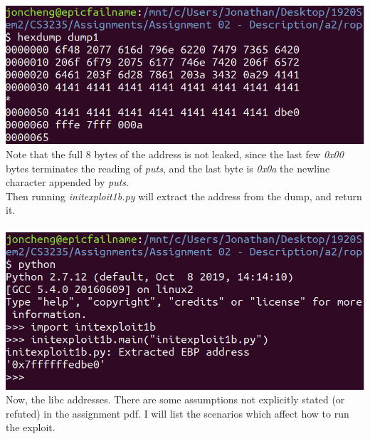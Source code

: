 \documentclass[12pt]{article}
\begin{document}
\includegraphics[scale=0.7]{./a2/rop/dump1.PNG}\\

Note that the full 8 bytes of the address is not leaked, since the last few \emph{0x00} bytes terminates the reading of \emph{puts}, and the last byte is \emph{0x0a} the newline character appended by \emph{puts}.\\

Then running \emph{initexploit1b.py} will extract the address from the dump, and return it.\\\\

\includegraphics[scale=0.7]{./a2/rop/dump1_ext.PNG}\\

Now, the libc addresses. There are some assumptions not explicitly stated (or refuted) in the assignment pdf. I will list the scenarios which affect how to run the exploit.\\
\end{document}
